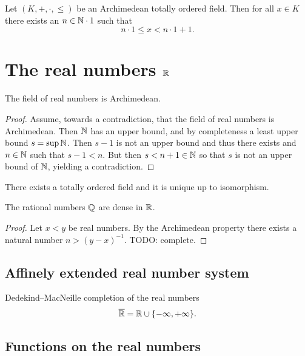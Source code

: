 \begin{lemma}
Let $(K,+,\cdot, \leq)$ be an Archimedean totally ordered field. Then for all $x\in K$ there exists an $n\in\mathbb{N}\cdot 1$ such that
\[ n\cdot 1 \leq x < n\cdot 1 + 1. \]
\end{lemma}



\chapter{The real numbers $\mathbb{R}$}

\begin{proposition}
The field of real numbers is Archimedean.
\end{proposition}
\begin{proof}
Assume, towards a contradiction, that the field of real numbers is Archimedean. Then $\mathbb{N}$ has an upper bound, and by completeness a least upper bound $s = \sup\mathbb{N}$. Then $s-1$ is not an upper bound and thus there exists and $n\in\mathbb{N}$ such that $s-1<n$. But then $s<n+1 \in \mathbb{N}$ so that $s$ is not an upper bound of $\mathbb{N}$, yielding a contradiction.
\end{proof}

\begin{proposition}
There exists a totally ordered field and it is unique up to isomorphism.
\end{proposition}

\begin{proposition}
The rational numbers $\mathbb{Q}$ are dense in $\mathbb{R}$.
\end{proposition}
\begin{proof}
Let $x < y$ be real numbers. By the Archimedean property there exists a natural number $n>(y-x)^{-1}$. TODO: complete.
\end{proof}

\section{Affinely extended real number system}
\begin{definition}
Dedekind–MacNeille completion of the real numbers
\[ \overline{\mathbb{R}} = \mathbb{R}\cup\{-\infty, +\infty\}. \]
\end{definition}


\section{Functions on the real numbers}

